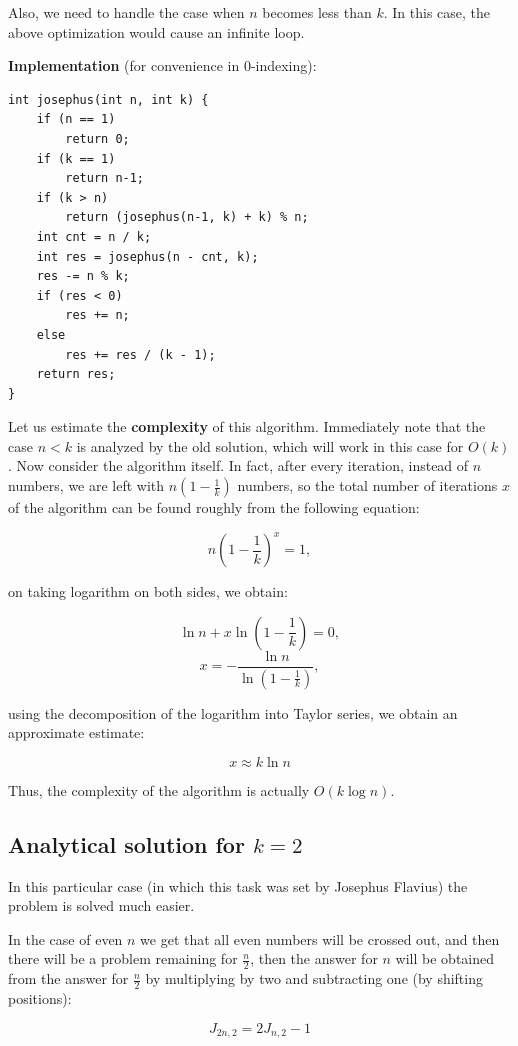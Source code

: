 Also, we need to handle the case when $n$ becomes less than $k$. In this case, the above optimization would cause an infinite loop.

\textbf{Implementation} (for convenience in 0-indexing):

\begin{verbatim}
int josephus(int n, int k) {
    if (n == 1)
        return 0;
    if (k == 1)
        return n-1;
    if (k > n)
        return (josephus(n-1, k) + k) % n;
    int cnt = n / k;
    int res = josephus(n - cnt, k);
    res -= n % k;
    if (res < 0)
        res += n;
    else
        res += res / (k - 1);
    return res;
}
\end{verbatim}

Let us estimate the \textbf{complexity} of this algorithm. Immediately note that the case $n < k$ is analyzed by the old solution, which will work in this case for $O(k)$. Now consider the algorithm itself. In fact, after every iteration, instead of $n$ numbers, we are left with $n \left( 1 - \frac{1}{k} \right)$ numbers, so the total number of iterations $x$ of the algorithm can be found roughly from the following equation:

$$ n \left(1 - \frac{1}{k} \right) ^ x = 1, $$

on taking logarithm on both sides, we obtain:

$$\ln n + x \ln \left(1 - \frac{1}{k} \right) = 0,$$ 
$$x = - \frac{\ln n}{\ln \left(1 - \frac{1}{k} \right)},$$

using the decomposition of the logarithm into Taylor series, we obtain an approximate estimate:

$$x \approx k \ln n$$

Thus, the complexity of the algorithm is actually $O (k \log n)$.

\subsection{Analytical solution for $k = 2$}

In this particular case (in which this task was set by Josephus Flavius) the problem is solved much easier.

In the case of even $n$ we get that all even numbers will be crossed out, and then there will be a problem remaining for $\frac{n}{2}$, then the answer for $n$ will be obtained from the answer for $\frac{n}{2}$ by multiplying by two and subtracting one (by shifting positions):

$$ J_{2n, 2} = 2 J_{n, 2} - 1 $$


